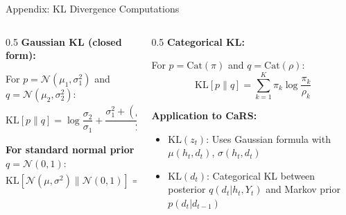 \documentclass[aspectratio=169]{beamer}
\begin{document}
\begin{frame}{Appendix: KL Divergence Computations}
\begin{columns}
\begin{column}{0.5\textwidth}
\textbf{Gaussian KL (closed form):}

For $p = \mathcal{N}(\mu_1, \sigma_1^2)$ and $q = \mathcal{N}(\mu_2, \sigma_2^2)$:
\begin{equation*}
\text{KL}[p \| q] = \log\frac{\sigma_2}{\sigma_1} + \frac{\sigma_1^2 + (\mu_1 - \mu_2)^2}{2\sigma_2^2} - \frac{1}{2}
\end{equation*}

\vspace{0.2cm}
\textbf{For standard normal prior} $q = \mathcal{N}(0, 1)$:
\begin{equation*}
\text{KL}[\mathcal{N}(\mu, \sigma^2) \| \mathcal{N}(0,1)] = -\frac{1}{2}(1 + \log\sigma^2 - \mu^2 - \sigma^2)
\end{equation*}
\end{column}

\begin{column}{0.5\textwidth}
\textbf{Categorical KL:}

For $p = \text{Cat}(\pi)$ and $q = \text{Cat}(\rho)$:
\begin{equation*}
\text{KL}[p \| q] = \sum_{k=1}^{K} \pi_k \log\frac{\pi_k}{\rho_k}
\end{equation*}

\vspace{0.2cm}
\textbf{Application to CaRS:}
\begin{itemize}
    \item $\text{KL}(z_t)$: Uses Gaussian formula with $\mu(h_t, d_t)$, $\sigma(h_t, d_t)$
    \item $\text{KL}(d_t)$: Categorical KL between posterior $q(d_t|h_t,Y_t)$ and Markov prior $p(d_t|d_{t-1})$
\end{itemize}
\end{column}
\end{columns}
\end{frame}
\end{document}
